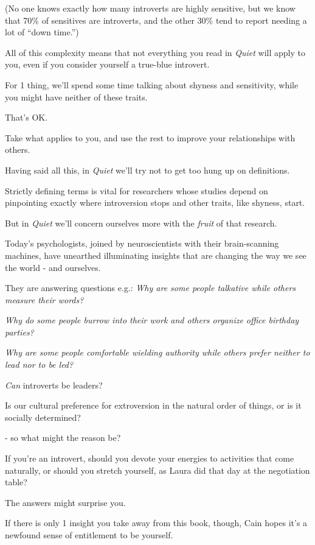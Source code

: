 \documentclass[oneside]{article}
\numberwithin{equation}{section}
\begin{document}
(No one knows exactly how many introverts are highly sensitive, but we know that 70\% of sensitives are introverts, and the other 30\% tend to report needing a lot of ``down time.'')

%
All of this complexity means that not everything you read in \textit{Quiet} will apply to you, even if you consider yourself a true-blue introvert.

For 1 thing, we'll spend some time talking about shyness and sensitivity, while you might have neither of these traits.

That's OK.

Take what applies to you, and use the rest to improve your relationships with others.

%
Having said all this, in \textit{Quiet} we'll try not to get too hung up on definitions.

Strictly defining terms is vital for researchers whose studies depend on pinpointing exactly where introversion stops and other traits, like shyness, start.

But in \textit{Quiet} we'll concern ourselves more with the \textit{fruit} of that research.

Today's psychologists, joined by neuroscientists with their brain-scanning machines, have unearthed illuminating insights that are changing the way we see the world - and ourselves.

They are answering questions e.g.: \textit{Why are some people talkative while others measure their words?}

\textit{Why do some people burrow into their work and others organize office birthday parties?}

\textit{Why are some people comfortable wielding authority while others prefer neither to lead nor to be led?}

\textit{Can} introverts be leaders?

Is our cultural preference for extroversion in the natural order of things, or is it socially determined?

 - so what might the reason be?

If you're an introvert, should you devote your energies to activities that come naturally, or should you stretch yourself, as Laura did that day at the negotiation table?

%
The answers might surprise you.

%
If there is only 1 insight you take away from this book, though, Cain hopes it's a newfound sense of entitlement to be yourself.
\end{document}
